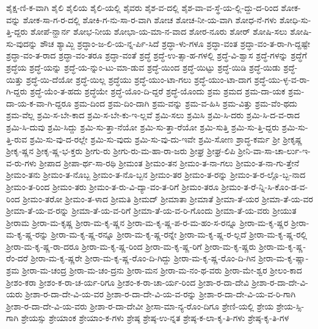 {ಶೈಕ್ಷ-ಣಿ-ಕ-ವಾಗಿ
ಶೈಲಿ
ಶೈಲಿಯ
ಶೈಲಿ-ಯಲ್ಲಿ
ಶೈವರು
ಶೈಶ-ವ-ದಲ್ಲಿ
ಶೈಶ-ವಾ-ವ-ಸ್ಥೆ-ಯ-ಲ್ಲಿ-ದ್ದು-ದ-ರಿಂದ
ಶೋಕ-ವನ್ನು
ಶೋಕ-ಸಾ-ಗ-ರ-ದಲ್ಲಿ
ಶೋಕಿ-ಗ-ನು-ಸಾ-ರ-ವಾಗಿ
ಶೋಚ
ಶೋಚ-ನೀ-ಯ-ವಾಗಿ
ಶೋಧ-ನೆ-ಗಳು
ಶೋಧಿ-ಸು-ತ್ತಿ-ದ್ದರು
ಶೋಪೆ-ನ್ಹಾರ್ನ
ಶೋಭ-ನೀಯ
ಶೋಭಾ-ಯ-ಮಾ-ನ-ವಾದ
ಶೋರ-ನೂರು
ಶೋರ್
ಶೋಷಿ-ಸಲು
ಶೋಷಿ-ಸು-ವುದನ್ನು
ಶೌಚ
ಶ್ಯಾಮ್ಜಿ
ಶ್ರದ್ಧಾಂ-ಜ-ಲಿ-ಯ-ನ್ನ-ರ್ಪಿ-ಸಿದೆ
ಶ್ರದ್ಧಾ-ಳು-ಗಳೂ
ಶ್ರದ್ಧಾ-ವಂತ
ಶ್ರದ್ಧಾ-ವಂ-ತ-ರಾ-ಗಿ-ದ್ದಷ್ಟೇ
ಶ್ರದ್ಧಾ-ವಂ-ತ-ರಾದ
ಶ್ರದ್ಧಾ-ವಂ-ತರೂ
ಶ್ರದ್ಧಾ-ವಂತೆ
ಶ್ರದ್ಧೆ
ಶ್ರದ್ಧೆ-ಉ-ತ್ಸಾ-ಹ-ಗಳಲ್ಲಿ
ಶ್ರದ್ಧೆ-ವಿ-ಶ್ವಾಸ
ಶ್ರದ್ಧೆ-ಗಳನ್ನು
ಶ್ರದ್ಧೆಗೆ
ಶ್ರದ್ಧೆಯ
ಶ್ರದ್ಧೆ-ಯನ್ನು
ಶ್ರದ್ಧೆ-ಯ-ನ್ನುಂ-ಟು-ಮಾ-ಡುವ
ಶ್ರದ್ಧೆ-ಯಿಂದ
ಶ್ರದ್ಧೆ-ಯಿಟ್ಟು
ಶ್ರದ್ಧೆ-ಯಿಡಿ
ಶ್ರದ್ಧೆ-ಯಿಡು
ಶ್ರದ್ಧೆ-ಯಿತ್ತು
ಶ್ರದ್ಧೆ-ಯಿ-ದೆಯೋ
ಶ್ರದ್ಧೆ-ಯಿಲ್ಲ
ಶ್ರದ್ಧೆಯು
ಶ್ರದ್ಧೆ-ಯುಂ-ಟಾ-ಗಲು
ಶ್ರದ್ಧೆ-ಯುಂ-ಟಾ-ದಾಗ
ಶ್ರದ್ಧೆ-ಯು-ಳ್ಳ-ವ-ರಾ-ಗಿ-ದ್ದರು
ಶ್ರದ್ಧೆ-ಯೆಂ-ತ-ಹದು
ಶ್ರದ್ಧೆಯೇ
ಶ್ರದ್ಧೆ-ಯೊಂ-ದಿ-ದ್ದರೆ
ಶ್ರದ್ಧೆ-ಯೊಂದು
ಶ್ರಮ
ಶ್ರಮದ
ಶ್ರಮ-ದಾ-ಯಕ
ಶ್ರಮ-ದಾ-ಯ-ಕ-ವಾ-ಗಿ-ದ್ದರೂ
ಶ್ರಮ-ದಿಂದ
ಶ್ರಮ-ದಿಂ-ದಾಗಿ
ಶ್ರಮ-ವನ್ನು
ಶ್ರಮ-ವ-ಹಿಸಿ
ಶ್ರಮ-ವಿತ್ತು
ಶ್ರಮ-ವೆಂ-ಥದು
ಶ್ರಮ-ವೆಲ್ಲ
ಶ್ರಮಿ-ಸ-ಬೇ-ಕಾದ
ಶ್ರಮಿ-ಸ-ಬೇ-ಕು-ಇ-ಲ್ಲವೆ
ಶ್ರಮಿ-ಸಲು
ಶ್ರಮಿಸಿ
ಶ್ರಮಿ-ಸಿ-ದರು
ಶ್ರಮಿ-ಸಿ-ದ-ವ-ರಾದ
ಶ್ರಮಿ-ಸಿ-ದುವು
ಶ್ರಮಿ-ಸಿದ್ದು
ಶ್ರಮಿ-ಸು-ತ್ತಾ-ನೆಯೋ
ಶ್ರಮಿ-ಸು-ತ್ತಾ-ರೆಯೋ
ಶ್ರಮಿ-ಸುತ್ತಿ
ಶ್ರಮಿ-ಸು-ತ್ತಿ-ದ್ದರು
ಶ್ರಮಿ-ಸು-ತ್ತಿ-ರುವ
ಶ್ರಮಿ-ಸು-ವು-ದ-ರಲ್ಲೇ
ಶ್ರಮಿ-ಸು-ವುದು
ಶ್ರಮಿ-ಸು-ವು-ದು-ಇವೇ
ಶ್ರಮಿ-ಸೋಣ
ಶ್ರಾದ್ಧ-ಕರ್ಮ
ಶ್ರೀ
ಶ್ರೀಕೃಷ್ಣ
ಶ್ರೀಕೃ-ಷ್ಣನ
ಶ್ರೀಕೃ-ಷ್ಣ-ಭ-ಕ್ತರು
ಶ್ರೀಗು-ರು
ಶ್ರೀಗು-ರು-ಮ-ಹಾ-ರಾ-ಜರು
ಶ್ರೀಘ್ರ
ಶ್ರೀಘ್ರ-ಲಿಪಿ
ಶ್ರೀನಿ-ವಾ-ಸಾ-ಚಾ-ರ್ಲು-ಇ-ವ-ರು-ಗಳು
ಶ್ರೀಪಾದ
ಶ್ರೀಪಾ-ರ್ಥ-ಸಾ-ರಥಿ
ಶ್ರೀಮಂತ
ಶ್ರೀಮಂ-ತನ
ಶ್ರೀಮಂ-ತ-ನಾ-ಗಲು
ಶ್ರೀಮಂ-ತ-ನಾ-ಗು-ತ್ತೇನೆ
ಶ್ರೀಮಂ-ತನು
ಶ್ರೀಮಂ-ತ-ನೊಬ್ಬ
ಶ್ರೀಮಂ-ತ-ನೊ-ಬ್ಬನ
ಶ್ರೀಮಂ-ತರ
ಶ್ರೀಮಂ-ತ-ರನ್ನು
ಶ್ರೀಮಂ-ತ-ರ-ಲ್ಲೊ-ಬ್ಬ-ನಾದ
ಶ್ರೀಮಂ-ತ-ರಿಂದ
ಶ್ರೀಮಂ-ತರು
ಶ್ರೀಮಂ-ತ-ರು-ವಿ-ದ್ಯಾ-ವಂ-ತ-ರಿಗೆ
ಶ್ರೀಮಂ-ತರೂ
ಶ್ರೀಮಂ-ತ-ರೆ-ನ್ನಿ-ಸಿ-ಕೊಂ-ಡ-ವ-ರಿಂದ
ಶ್ರೀಮಂ-ತರೋ
ಶ್ರೀಮಂ-ತ-ಳಾದ
ಶ್ರೀಮತಿ
ಶ್ರೀಮದ್
ಶ್ರೀಮಾತಾ
ಶ್ರೀಮಾತೆ
ಶ್ರೀಮಾ-ತೆ-ಯರ
ಶ್ರೀಮಾ-ತೆ-ಯ-ವರ
ಶ್ರೀಮಾ-ತೆ-ಯ-ವ-ರನ್ನು
ಶ್ರೀಮಾ-ತೆ-ಯ-ವ-ರಿಗೆ
ಶ್ರೀಮಾ-ತೆ-ಯ-ವ-ರಿ-ಗೊಂದು
ಶ್ರೀಮಾ-ತೆ-ಯ-ವರು
ಶ್ರೀಯುತ
ಶ್ರೀರಾಮ
ಶ್ರೀರಾ-ಮ-ಕೃಷ್ಣ
ಶ್ರೀರಾ-ಮ-ಕೃ-ಷ್ಣನ
ಶ್ರೀರಾ-ಮ-ಕೃ-ಷ್ಣ-ಪ-ರ-ಮ-ಹಂ-ಸ-ರನ್ನೂ
ಶ್ರೀರಾ-ಮ-ಕೃ-ಷ್ಣರ
ಶ್ರೀರಾ-ಮ-ಕೃ-ಷ್ಣ-ರನ್ನು
ಶ್ರೀರಾ-ಮ-ಕೃ-ಷ್ಣ-ರನ್ನೂ
ಶ್ರೀರಾ-ಮ-ಕೃ-ಷ್ಣ-ರನ್ನೇ
ಶ್ರೀರಾ-ಮ-ಕೃ-ಷ್ಣ-ರ-ಲ್ಲದೆ
ಶ್ರೀರಾ-ಮ-ಕೃ-ಷ್ಣ-ರಲ್ಲಿ
ಶ್ರೀರಾ-ಮ-ಕೃ-ಷ್ಣ-ರಾ-ದರೂ
ಶ್ರೀರಾ-ಮ-ಕೃ-ಷ್ಣ-ರಿಂದ
ಶ್ರೀರಾ-ಮ-ಕೃ-ಷ್ಣ-ರಿಗೆ
ಶ್ರೀರಾ-ಮ-ಕೃ-ಷ್ಣರು
ಶ್ರೀರಾ-ಮ-ಕೃ-ಷ್ಣ-ರೆಂ-ದರೆ
ಶ್ರೀರಾ-ಮ-ಕೃ-ಷ್ಣರೇ
ಶ್ರೀರಾ-ಮ-ಕೃ-ಷ್ಣ-ರೊಂ-ದಿ-ಗಿದ್ದು
ಶ್ರೀರಾ-ಮ-ಕೃ-ಷ್ಣ-ರೊಂ-ದಿ-ಗಿನ
ಶ್ರೀರಾ-ಮ-ಕೃ-ಷ್ಣಾ-ಶ್ರಮ
ಶ್ರೀರಾ-ಮ-ಚಂದ್ರ
ಶ್ರೀರಾ-ಮ-ಚಂ-ದ್ರನು
ಶ್ರೀರಾ-ಮನ
ಶ್ರೀರಾ-ಮ-ನಂ-ಥ-ವರು
ಶ್ರೀರಾ-ಮೇ-ಶ್ವರ
ಶ್ರೀಲಂ-ಕಾದ
ಶ್ರೀಶಂ-ಕರಾ
ಶ್ರೀಶಂ-ಕ-ರಾ-ಚ-ರ್ಯ-ರಿಗೂ
ಶ್ರೀಶಂ-ಕ-ರಾ-ಚಾ-ರ್ಯ-ರಿಂದ
ಶ್ರೀಶಾ-ರ-ದಾ-ದೇವಿ
ಶ್ರೀಶಾ-ರ-ದಾ-ದೇ-ವಿ-ಯರು
ಶ್ರೀಶಾ-ರ-ದಾ-ದೇ-ವಿ-ಯ-ವರ
ಶ್ರೀಶಾ-ರ-ದಾ-ದೇ-ವಿ-ಯ-ವ-ರನ್ನು
ಶ್ರೀಶಾ-ರ-ದಾ-ದೇ-ವಿ-ಯ-ವ-ರಿ-ಗಾಗಿ
ಶ್ರೀಶಾ-ರ-ದಾ-ದೇ-ವಿ-ಯ-ವರು
ಶ್ರೀಶಾ-ರ-ದಾ-ದೇವೀ
ಶ್ರೀಸಾ-ಮಾ-ನ್ಯ-ರೊಂ-ದಿಗೂ
ಶ್ರೇಣಿ-ಯಲ್ಲಿ
ಶ್ರೇಯ
ಶ್ರೇಯ-ಸ್ಸಿ-ಗಾಗಿ
ಶ್ರೇಯಸ್ಸು
ಶ್ರೇಯಾಂಕ
ಶ್ರೇಯಾಂ-ಕ-ಗಳು
ಶ್ರೇಷ್ಠ
ಶ್ರೇಷ್ಠ-ಉ-ನ್ನತ
ಶ್ರೇಷ್ಠ-ಕ-ಲಾ-ಕೃ-ತಿ-ಗಳು
ಶ್ರೇಷ್ಠ-ಕೃ-ತಿ-ಗಳ
}
